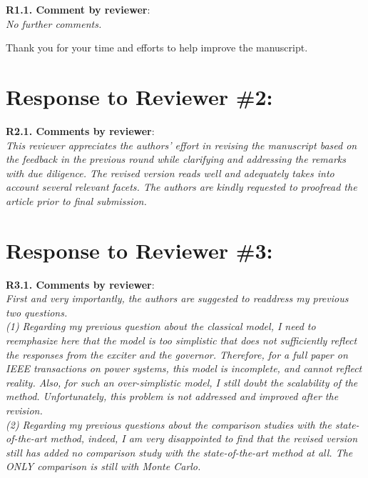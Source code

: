 \documentclass[12pt,onecolumn]{IEEEtran}
\newcommand{\blue}{\color{blue}}
\newcommand{\nib}{\noindent  {\bf Response:} }
\begin{document}
\noindent
{\bf R1.1. Comment by reviewer}:\\
{\em No further comments.}


{\nib {\blue Thank you for your time and efforts to help improve the manuscript.}
}




\section*{\large \bf Response to Reviewer \#2:}

\noindent
{\bf R2.1. Comments by reviewer}:\\
{\em This reviewer appreciates the authors' effort in revising the manuscript based on the feedback in the previous round while clarifying and addressing the remarks with due diligence. The revised version reads well and adequately takes into account several relevant facets. The authors are kindly requested to proofread the article prior to final submission.}

{\nib \blue{Thank you, we have thoroughly proofread the article. We appreciate your comments from previous rounds to help us improve the manuscript.}}


\newpage
\section*{\large \bf Response to Reviewer \#3:}

\noindent
{\bf R3.1. Comments by reviewer}:\\
{\em First and very importantly, the authors are suggested to readdress my previous two questions.\\
\noindent(1) Regarding my previous question about the classical model, I need to reemphasize here that the model is too simplistic that does not sufficiently reflect the responses from the exciter and the governor. Therefore, for a full paper on IEEE transactions on power systems, this model is incomplete, and cannot reflect reality. Also, for such an over-simplistic model, I still doubt the scalability of the method. Unfortunately, this problem is not addressed and improved after the revision.\\
\noindent(2) Regarding my previous questions about the comparison studies with the state-of-the-art method, indeed, I am very disappointed to find that the revised version still has added no comparison study with the state-of-the-art method at all. The ONLY comparison is still with Monte Carlo.}
\end{document}
